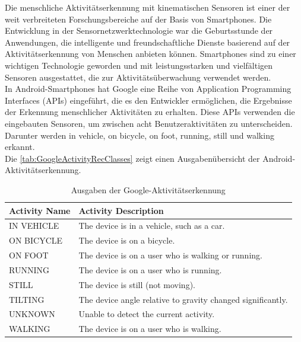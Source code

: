 Die menschliche Aktivitätserkennung mit kinematischen Sensoren ist einer der weit verbreiteten Forschungsbereiche auf der Basis von Smartphones. Die Entwicklung in der Sensornetzwerktechnologie war die Geburtsstunde der Anwendungen, die intelligente und freundschaftliche Dienste basierend auf der Aktivitätserkennung von Menschen anbieten können.
Smartphones sind zu einer wichtigen Technologie geworden und mit leistungsstarken und vielfältigen Sensoren ausgestattet, die zur Aktivitätsüberwachung verwendet werden. \citep{Rasheed2015} \\
In Android-Smartphones hat Google eine Reihe von Application Programming Interfaces (APIs) eingeführt, die es den Entwickler ermöglichen, die Ergebnisse der Erkennung menschlicher Aktivitäten zu erhalten.
Diese APIs verwenden die eingebauten Sensoren, um zwischen acht Benutzeraktivitäten zu unterscheiden. Darunter werden \glqq in vehicle\grqq{}, \glqq on bicycle\grqq{}, \glqq on foot\grqq{}, \glqq running\grqq{}, \glqq still\grqq{} und \glqq walking\grqq{} erkannt. \citep{Tran2016}\citep{Elbayoumy2018}\\

Die \autoref{tab:GoogleActivityRecClasses} zeigt einen Ausgabenübersicht der Android-Aktivitätserkennung. \\

\begin{table}[htpb]
	\caption{Ausgaben der Google-Aktivitätserkennung\citep{Elbayoumy2018}} 
	\centering
	\begin{tabular} {|l|l|} %
		\hline
		\textbf{Activity Name} & \textbf{Activity Description}\\
		\hline
		IN VEHICLE & The device is in a vehicle, such as a car.\\
		\hline
		ON BICYCLE & The device is on a bicycle.\\
		\hline
		ON FOOT & The device is on a user who is walking or running.\\
		\hline
		RUNNING & The device is on a user who is running.\\
		\hline
		STILL  & The device is still (not moving).\\
		\hline
		TILTING  & The device angle relative to gravity changed significantly.\\
		\hline
		UNKNOWN  & Unable to detect the current activity.\\
		\hline
		WALKING & The device is on a user who is walking.\\
		\hline
	\end{tabular}
	\label{tab:GoogleActivityRecClasses}
\end{table}


